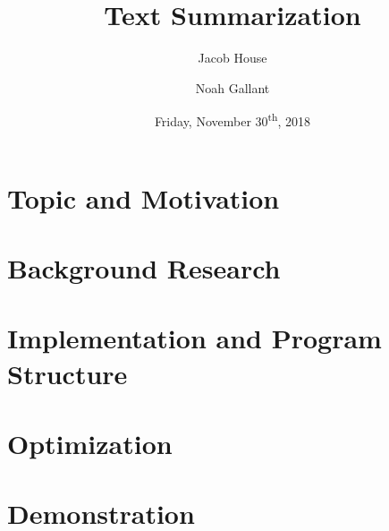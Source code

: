 \documentclass[12pt]{article}
\title{Text Summarization}
\author{Jacob House \and Noah Gallant}
\date{Friday, November 30\textsuperscript{th}, 2018}
\begin{document}
	\maketitle
	\tableofcontents 
	\setcounter{page}{1}
	\section{Topic and Motivation}
	
	
	\section{Background Research}
	
	
	\section{Implementation and Program Structure}
	
	
	\section{Optimization}
	
	
	\printbibliography
	\appendix
	\section{Demonstration}
	
	
\end{document}
